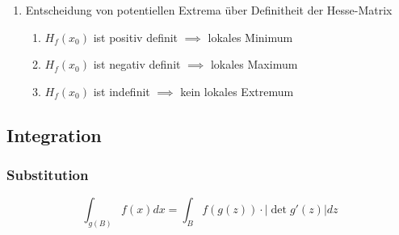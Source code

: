 \documentclass[]{article}
\begin{document}
\begin{enumerate}[]
\begin{enumerate}[]
\begin{enumerate}[]
					\end{enumerate}
				\end{enumerate}
				\item Entscheidung von potentiellen Extrema über Definitheit der Hesse-Matrix
				\begin{enumerate}[]
					\item \begin{math} H_f(x_0) \end{math} ist positiv definit \begin{math} \implies \end{math}  lokales Minimum 
					\item \begin{math} H_f(x_0) \end{math} ist negativ definit \begin{math} \implies \end{math}  lokales Maximum
					\item \begin{math} H_f(x_0) \end{math} ist indefinit \begin{math} \implies \end{math}  kein lokales Extremum
				\end{enumerate}
			\end{enumerate}
	
		\subsection{Integration}
		
			\subsubsection{Substitution}
			
				\begin{displaymath}
					\int_{g(B)} f(x) dx = \int_{B} f(g(z)) \cdot |\det g'(z)| dz
				\end{displaymath}
			
\end{document}
